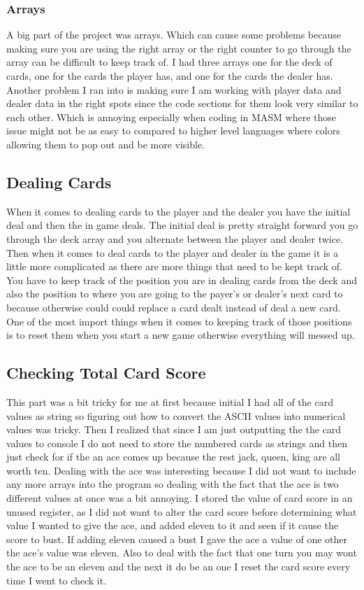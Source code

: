 \documentclass[twoside]{article}
\begin{document}
\subsubsection{Arrays}
A big part of the project was arrays. Which can cause some problems because making sure you are using the right array or the right counter to go through the array can be difficult to keep track of. I had three arrays one for the deck of cards, one for the cards the player has, and one for the cards the dealer has. Another problem I ran into is making sure I am working with player data and dealer data in the right spots since the code sections for them look very similar to each other. Which is annoying especially when coding in MASM where those issue might not be as easy to compared to higher level languages where colors allowing them to pop out and be more visible.

\subsection{Dealing Cards}
When it comes to dealing cards to the player and the dealer you have the initial deal and then the in game deals. The initial deal is pretty straight forward you go through the deck array and you alternate between the player and dealer twice. Then when it comes to deal cards to the player and dealer in the game it is a little more complicated as there are more things that need to be kept track of. You have to keep track of the position you are in dealing cards from the deck and also the position to where you are going to the payer's or dealer's next card to because otherwise could could replace a card dealt instead of deal a new card. One of the most import things when it comes to keeping track of those positions is to reset them when you start a new game otherwise everything will messed up.

\subsection{Checking Total Card Score}
This part was a bit tricky for me at first because initial I had all of the card values as string so figuring out how to convert the ASCII values into numerical values was tricky. Then I realized that since I am just outputting the the card values to console I do not need to store the numbered cards as strings and then just check for if the an ace comes up because the rest jack, queen, king are all worth ten. Dealing with the ace was interesting because I did not want to include any more arrays into the program so dealing with the fact that the ace is two different values at once was a bit annoying. I stored the value of card score in an unused register, as I did not want to alter the card score before determining what value I wanted to give the ace, and added eleven to it and seen if it cause the score to bust. If adding eleven caused a bust I gave the ace a value of one other the ace's value was eleven. Also to deal with the fact that one turn you may wont the ace to be an eleven and the next it do be an one I reset the card score every time I went to check it.
\end{document}
